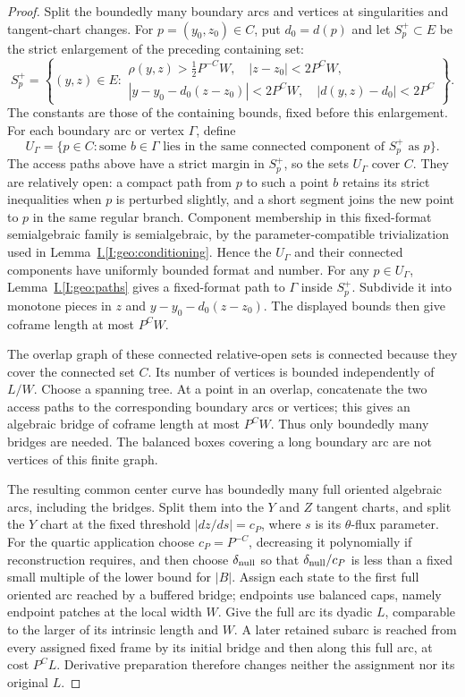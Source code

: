 \documentclass[11pt]{amsart}
\theoremstyle{definition}
\theoremstyle{remark}
\numberwithin{equation}{section}
\newcommand{\partIref}[1]{\hyperref[I:#1]{I.\ref*{I:#1}}}
\begin{document}
\begin{proof}
Split the boundedly many boundary arcs and vertices at singularities and tangent-chart changes. For $p=(y_0,z_0)\in C$, put $d_0=d(p)$ and let $S_p^+\subset E$ be the strict enlargement of the preceding containing set:
\[
S_p^+=\left\{(y,z)\in E:
\begin{gathered}
\rho(y,z)>\tfrac12P^{-C}W,\quad |z-z_0|<2P^CW,\\
|y-y_0-d_0(z-z_0)|<2P^CW,\quad |d(y,z)-d_0|<2P^C
\end{gathered}\right\}.
\]
The constants are those of the containing bounds, fixed before this enlargement. For each boundary arc or vertex $\Gamma$, define
\[
U_\Gamma=\{p\in C:\text{some }b\in\Gamma\text{ lies in the same connected component of }S_p^+\text{ as }p\}.
\]
The access paths above have a strict margin in $S_p^+$, so the sets $U_\Gamma$ cover $C$. They are relatively open: a compact path from $p$ to such a point $b$ retains its strict inequalities when $p$ is perturbed slightly, and a short segment joins the new point to $p$ in the same regular branch. Component membership in this fixed-format semialgebraic family is semialgebraic, by the parameter-compatible trivialization used in Lemma~\partIref{geo:conditioning}. Hence the $U_\Gamma$ and their connected components have uniformly bounded format and number. For any $p\in U_\Gamma$, Lemma~\partIref{geo:paths} gives a fixed-format path to $\Gamma$ inside $S_p^+$. Subdivide it into monotone pieces in $z$ and $y-y_0-d_0(z-z_0)$. The displayed bounds then give coframe length at most $P^CW$.

The overlap graph of these connected relative-open sets is connected because they cover the connected set $C$. Its number of vertices is bounded independently of $L/W$. Choose a spanning tree. At a point in an overlap, concatenate the two access paths to the corresponding boundary arcs or vertices; this gives an algebraic bridge of coframe length at most $P^CW$. Thus only boundedly many bridges are needed. The balanced boxes covering a long boundary arc are not vertices of this finite graph.

The resulting common center curve has boundedly many full oriented algebraic arcs, including the bridges. Split them into the $Y$ and $Z$ tangent charts, and split the $Y$ chart at the fixed threshold $|dz/ds|=c_P$, where $s$ is its $\theta$-flux parameter. For the quartic application choose $c_P=P^{-C}$, decreasing it polynomially if reconstruction requires, and then choose $\delta_{\rm null}$ so that $\delta_{\rm null}/c_P$ is less than a fixed small multiple of the lower bound for $|B|$. Assign each state to the first full oriented arc reached by a buffered bridge; endpoints use balanced caps, namely endpoint patches at the local width $W$. Give the full arc its dyadic $L$, comparable to the larger of its intrinsic length and $W$. A later retained subarc is reached from every assigned fixed frame by its initial bridge and then along this full arc, at cost $P^CL$. Derivative preparation therefore changes neither the assignment nor its original $L$.


\end{proof}
\end{document}
